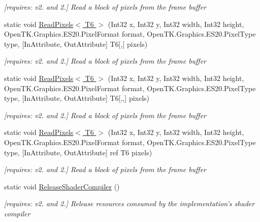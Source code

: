 \begin{DoxyCompactItemize}
\begin{DoxyCompactList}\small\item\em \mbox{[}requires\-: v2. and 2.\mbox{]} Read a block of pixels from the frame buffer \end{DoxyCompactList}\item 
static void \hyperlink{class_open_t_k_1_1_graphics_1_1_e_s20_1_1_g_l_a9e5eca84b915aa91e1b7be344138130a}{Read\-Pixels$<$ T6 $>$} (Int32 x, Int32 y, Int32 width, Int32 height, Open\-T\-K.\-Graphics.\-E\-S20.\-Pixel\-Format format, Open\-T\-K.\-Graphics.\-E\-S20.\-Pixel\-Type type, \mbox{[}In\-Attribute, Out\-Attribute\mbox{]} T6\mbox{[},\mbox{]} pixels)
\begin{DoxyCompactList}\small\item\em \mbox{[}requires\-: v2. and 2.\mbox{]} Read a block of pixels from the frame buffer \end{DoxyCompactList}\item 
static void \hyperlink{class_open_t_k_1_1_graphics_1_1_e_s20_1_1_g_l_a8536de75f539b966d735f20fb67532b7}{Read\-Pixels$<$ T6 $>$} (Int32 x, Int32 y, Int32 width, Int32 height, Open\-T\-K.\-Graphics.\-E\-S20.\-Pixel\-Format format, Open\-T\-K.\-Graphics.\-E\-S20.\-Pixel\-Type type, \mbox{[}In\-Attribute, Out\-Attribute\mbox{]} T6\mbox{[},,\mbox{]} pixels)
\begin{DoxyCompactList}\small\item\em \mbox{[}requires\-: v2. and 2.\mbox{]} Read a block of pixels from the frame buffer \end{DoxyCompactList}\item 
static void \hyperlink{class_open_t_k_1_1_graphics_1_1_e_s20_1_1_g_l_a3589ba2461afdf109cedea105cb445f9}{Read\-Pixels$<$ T6 $>$} (Int32 x, Int32 y, Int32 width, Int32 height, Open\-T\-K.\-Graphics.\-E\-S20.\-Pixel\-Format format, Open\-T\-K.\-Graphics.\-E\-S20.\-Pixel\-Type type, \mbox{[}In\-Attribute, Out\-Attribute\mbox{]} ref T6 pixels)
\begin{DoxyCompactList}\small\item\em \mbox{[}requires\-: v2. and 2.\mbox{]} Read a block of pixels from the frame buffer \end{DoxyCompactList}\item 
static void \hyperlink{class_open_t_k_1_1_graphics_1_1_e_s20_1_1_g_l_aa6d6a9df38e2f05cd1b094fc39c7e424}{Release\-Shader\-Compiler} ()
\begin{DoxyCompactList}\small\item\em \mbox{[}requires\-: v2. and 2.\mbox{]} Release resources consumed by the implementation's shader compiler \end{DoxyCompactList}\item 

\end{DoxyCompactItemize}
